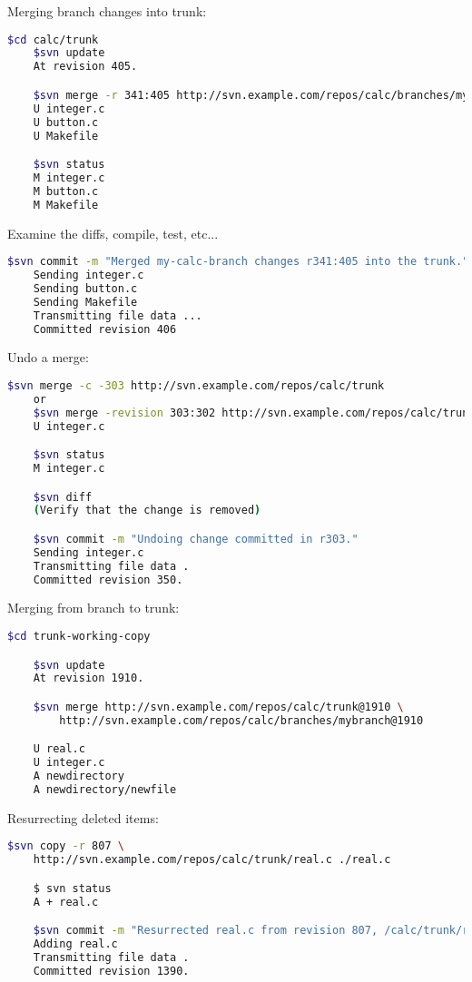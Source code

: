\documentclass{article}
\begin{document}
Merging branch changes into trunk:
\begin{lstlisting}[language=BASH]
    $cd calc/trunk
    $svn update
    At revision 405.

    $svn merge -r 341:405 http://svn.example.com/repos/calc/branches/my-calc-branch
    U integer.c
    U button.c
    U Makefile

    $svn status
    M integer.c
    M button.c
    M Makefile 
\end{lstlisting}
Examine the diffs, compile, test, etc...
\begin{lstlisting}[language=BASH]
    $svn commit -m "Merged my-calc-branch changes r341:405 into the trunk."
    Sending integer.c
    Sending button.c
    Sending Makefile
    Transmitting file data ...
    Committed revision 406 
\end{lstlisting}
Undo a merge:
\begin{lstlisting}[language=BASH]
    $svn merge -c -303 http://svn.example.com/repos/calc/trunk
    or
    $svn merge -revision 303:302 http://svn.example.com/repos/calc/trunk
    U integer.c

    $svn status
    M integer.c

    $svn diff
    (Verify that the change is removed)

    $svn commit -m "Undoing change committed in r303."
    Sending integer.c
    Transmitting file data .
    Committed revision 350.
\end{lstlisting}
Merging from branch to trunk:
\begin{lstlisting}[language=BASH]
    $cd trunk-working-copy

    $svn update
    At revision 1910.

    $svn merge http://svn.example.com/repos/calc/trunk@1910 \
    	http://svn.example.com/repos/calc/branches/mybranch@1910

    U real.c
    U integer.c
    A newdirectory
    A newdirectory/newfile
\end{lstlisting}
Resurrecting deleted items:
\begin{lstlisting}[language=BASH]
    $svn copy -r 807 \
    http://svn.example.com/repos/calc/trunk/real.c ./real.c

    $ svn status
    A + real.c

    $svn commit -m "Resurrected real.c from revision 807, /calc/trunk/real.c."
    Adding real.c
    Transmitting file data .
    Committed revision 1390.
\end{lstlisting}
\end{document}
